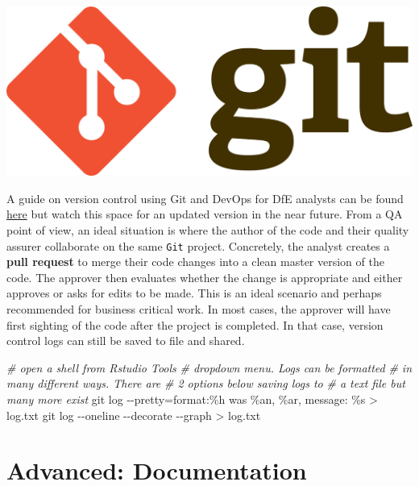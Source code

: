 \documentclass[
]{book}
\newenvironment{Shaded}{\begin{snugshade}}{\end{snugshade}}
\newcommand{\CommentTok}[1]{\textcolor[rgb]{0.56,0.35,0.01}{\textit{#1}}}
\newcommand{\NormalTok}[1]{#1}
\newcommand{\OtherTok}[1]{\textcolor[rgb]{0.56,0.35,0.01}{#1}}
\newcommand{\SpecialCharTok}[1]{\textcolor[rgb]{0.00,0.00,0.00}{#1}}
\newcommand{\StringTok}[1]{\textcolor[rgb]{0.31,0.60,0.02}{#1}}
\begin{document}
\includegraphics{pictures/version.png}

A guide on version control using Git and DevOps for DfE analysts can be found \href{https://dfe-analytical-services.github.io/vsts-for-analysis/}{here} but watch this space for an updated version in the near future. From a QA point of view, an ideal situation is where the author of the code and their quality assurer collaborate on the same \texttt{Git} project. Concretely, the analyst creates a \textbf{pull request} to merge their code changes into a clean master version of the code. The approver then evaluates whether the change is appropriate and either approves or asks for edits to be made. This is an ideal scenario and perhaps recommended for business critical work. In most cases, the approver will have first sighting of the code after the project is completed. In that case, version control logs can still be saved to file and shared.

\begin{Shaded}
\begin{Highlighting}[]
\CommentTok{\# open a shell from Rstudio Tools}
\CommentTok{\# dropdown menu. Logs can be formatted}
\CommentTok{\# in many different ways. There are }
\CommentTok{\# 2 options below saving logs to }
\CommentTok{\# a text file but many more exist}
\NormalTok{git log }\SpecialCharTok{{-}{-}}\NormalTok{pretty}\OtherTok{=}\NormalTok{format}\SpecialCharTok{:}\StringTok{\textquotesingle{}\%h was \%an, \%ar, message: \%s\textquotesingle{}} \SpecialCharTok{\textgreater{}}\NormalTok{ log.txt}
\NormalTok{git log }\SpecialCharTok{{-}{-}}\NormalTok{oneline }\SpecialCharTok{{-}{-}}\NormalTok{decorate }\SpecialCharTok{{-}{-}}\NormalTok{graph }\SpecialCharTok{\textgreater{}}\NormalTok{ log.txt}
\end{Highlighting}
\end{Shaded}

\hypertarget{documentation}{%
\chapter{Advanced: Documentation}\label{documentation}}
\end{document}
